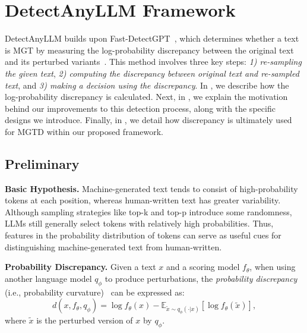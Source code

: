 \section{DetectAnyLLM Framework}
DetectAnyLLM builds upon Fast-DetectGPT~\cite{fastdetectgpt}, which determines whether a text is MGT by measuring the log-probability discrepancy between the original text and its perturbed variants~\cite{detectgpt}.
%
This method involves three key steps: \textit{1) re-sampling the given text}, \textit{2) computing the discrepancy between original text and re-sampled text}, and \textit{3) making a decision using the discrepancy}.
%
In , we describe how the log-probability discrepancy is calculated.
%
Next, in , we explain the motivation behind our improvements to this detection process, along with the specific designs we introduce.
%
Finally, in , we detail how discrepancy is ultimately used for MGTD within our proposed framework.

\subsection{Preliminary}\label{3.1}


\noindent \textbf{Basic Hypothesis. }
Machine-generated text tends to consist of high-probability tokens at each position, whereas human-written text has greater variability.
%
Although sampling strategies like top-k and top-p introduce some randomness, LLMs still generally select tokens with relatively high probabilities.
%
Thus, features in the probability distribution of tokens can serve as useful cues for distinguishing machine-generated text from human-written.


\noindent \textbf{Probability Discrepancy. }
Given a text $x$ and a scoring model $f_\theta$, when using another language model $q_\phi$ to produce perturbations, the \textit{probability discrepancy} (i.e., probability curvature)~\cite{detectgpt} can be expressed as:
\begin{equation}
    d(x, f_\theta, q_\phi) = \log f_\theta(x) - \mathbb E_{\tilde{x} \sim q_\phi(\cdot|x)}[\log f_\theta(\tilde{x})],
    \label{3.1.1}
\end{equation}
where $\tilde{x}$ is the perturbed version of $x$ by $q_\phi$.


